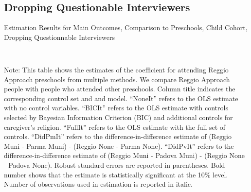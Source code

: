\subsection{Dropping Questionable Interviewers}



\begin{table}[H] \caption{Estimation Results for Main Outcomes, Comparison to Preschools, Child Cohort, Dropping Questionnable Interviewers} \label{ols-M-child-reg-pres-dropint}
\scalebox{0.8}{}
\vspace{1ex} \\
\footnotesize\raggedright{Note: This table shows the estimates of the coefficient for attending Reggio Approach preschools from multiple methods. We compare Reggio Approach people with people who attended other preschools. Column title indicates the corresponding control set and and model. ``NoneIt'' refers to the OLS estimate with no control variables. ``BICIt'' refers to the OLS estimate with controls selected by Bayesian Information Criterion (BIC) and additional controls for caregiver's religion. ``FullIt'' refers to the OLS estimate with the full set of controls. ``DidPmIt'' refers to the difference-in-difference estimate of (Reggio Muni - Parma Muni) - (Reggio None - Parma None). ``DidPvIt'' refers to the difference-in-difference estimate of (Reggio Muni - Padova Muni) - (Reggio None - Padova None). Robust standard errors are reported in parentheses. Bold number shows that the estimate is statistically significant at the 10\% level. Number of observations used in estimation is reported in italic.}

\end{table}


